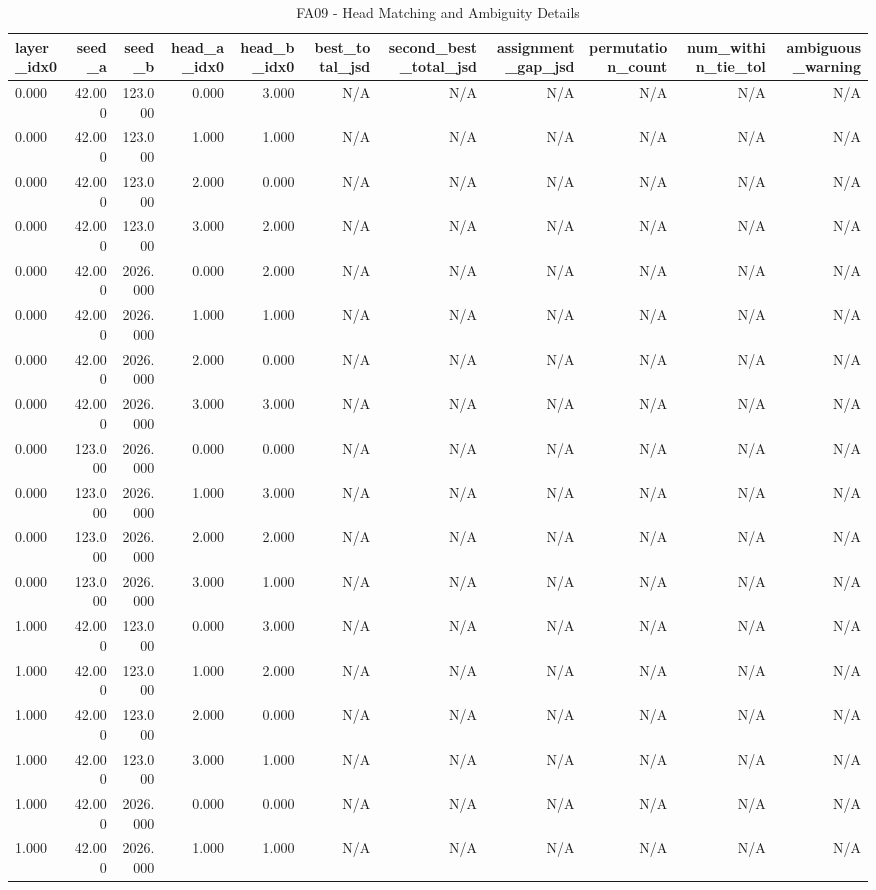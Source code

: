 \begin{table}[h!]
\centering
\caption{FA09 - Head Matching and Ambiguity Details}
\label{tab:fa09\_-\_head\_matching\_and\_ambiguity\_details}
\begin{tabular}{lrrrrrrrrrr}
\toprule
layer\_idx0 & seed\_a & seed\_b & head\_a\_idx0 & head\_b\_idx0 & best\_total\_jsd & second\_best\_total\_jsd & assignment\_gap\_jsd & permutation\_count & num\_within\_tie\_tol & ambiguous\_warning \\
\midrule
0.000 & 42.000 & 123.000 & 0.000 & 3.000 & N/A & N/A & N/A & N/A & N/A & N/A \\
0.000 & 42.000 & 123.000 & 1.000 & 1.000 & N/A & N/A & N/A & N/A & N/A & N/A \\
0.000 & 42.000 & 123.000 & 2.000 & 0.000 & N/A & N/A & N/A & N/A & N/A & N/A \\
0.000 & 42.000 & 123.000 & 3.000 & 2.000 & N/A & N/A & N/A & N/A & N/A & N/A \\
0.000 & 42.000 & 2026.000 & 0.000 & 2.000 & N/A & N/A & N/A & N/A & N/A & N/A \\
0.000 & 42.000 & 2026.000 & 1.000 & 1.000 & N/A & N/A & N/A & N/A & N/A & N/A \\
0.000 & 42.000 & 2026.000 & 2.000 & 0.000 & N/A & N/A & N/A & N/A & N/A & N/A \\
0.000 & 42.000 & 2026.000 & 3.000 & 3.000 & N/A & N/A & N/A & N/A & N/A & N/A \\
0.000 & 123.000 & 2026.000 & 0.000 & 0.000 & N/A & N/A & N/A & N/A & N/A & N/A \\
0.000 & 123.000 & 2026.000 & 1.000 & 3.000 & N/A & N/A & N/A & N/A & N/A & N/A \\
0.000 & 123.000 & 2026.000 & 2.000 & 2.000 & N/A & N/A & N/A & N/A & N/A & N/A \\
0.000 & 123.000 & 2026.000 & 3.000 & 1.000 & N/A & N/A & N/A & N/A & N/A & N/A \\
1.000 & 42.000 & 123.000 & 0.000 & 3.000 & N/A & N/A & N/A & N/A & N/A & N/A \\
1.000 & 42.000 & 123.000 & 1.000 & 2.000 & N/A & N/A & N/A & N/A & N/A & N/A \\
1.000 & 42.000 & 123.000 & 2.000 & 0.000 & N/A & N/A & N/A & N/A & N/A & N/A \\
1.000 & 42.000 & 123.000 & 3.000 & 1.000 & N/A & N/A & N/A & N/A & N/A & N/A \\
1.000 & 42.000 & 2026.000 & 0.000 & 0.000 & N/A & N/A & N/A & N/A & N/A & N/A \\
1.000 & 42.000 & 2026.000 & 1.000 & 1.000 & N/A & N/A & N/A & N/A & N/A & N/A \\

\end{tabular}
\end{table}
